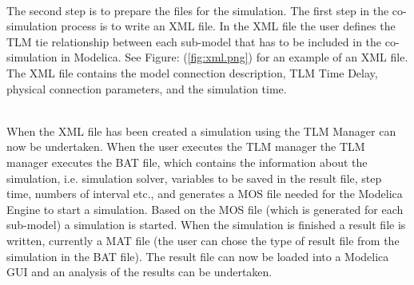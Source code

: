 ~\\The second step is to prepare the files for the simulation. The first step in the co-simulation process is to write an XML file. In the XML file the user defines the TLM tie relationship between each sub-model that has to be included in the co-simulation in Modelica. See Figure: (\ref{fig:xml.png}) for an example of an XML file. The XML file contains the model connection description, TLM Time Delay, physical connection parameters, and the simulation time.

~\\When the XML file has been created a simulation using the TLM Manager can now be undertaken. When the user executes the TLM manager the TLM manager executes the BAT file, which contains the information about the simulation, i.e. simulation solver, variables to be saved in the result file, step time, numbers of interval etc., and generates a MOS file needed for the Modelica Engine to start a simulation. Based on the MOS file (which is generated for each sub-model) a simulation is started. When the simulation is finished a result file is written, currently a MAT file (the user can chose the type of result file from the simulation in the BAT file). The result file can now be loaded into a Modelica GUI and an analysis of the results can be undertaken.


